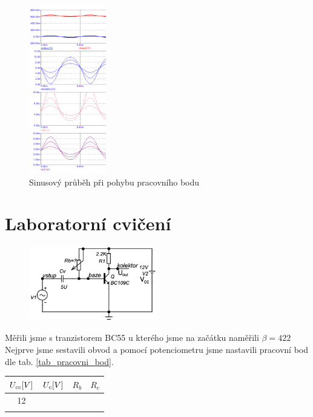 \documentclass{article}
\newcommand \tab[1]
{ tab. \ref{#1}}
\begin{document}
\begin{figure}[H]
  \includegraphics[width=0.3\textwidth]{PC/BJT/Tranzient_analyza_3.png}
  \caption{\label{prac_bod_sim_1} Sinusový průběh při pohybu pracovního bodu}
\end{figure}


\section{Laboratorní cvičení}

\begin{figure}
  \vspace{-10mm}
  \includegraphics[width=0.5\textwidth]{obvod-z-laborky.png}
  \caption{\label{obvod_z_laborky}}
\end{figure}
Měřili jsme s tranzistorem BC55 u kterého jsme na začátku naměřili \(\beta = 422\)
Nejprve jsme sestavili obvod a pomocí potenciometru jsme nastavili pracovní bod dle \tab{tab_pracovni_bod}.

\begin{tabular}{|c|c||c|c|}
  \hline
  \(U_{cc}\-[V]\) & \(U_{c}\-[V]\)  & \(R_b\)  &	\(R_c\)   \\ \hline
  12              &                 &          &            \\ \hline

  \label{tab_pracovni_bod}
\end{tabular}
\end{document}

